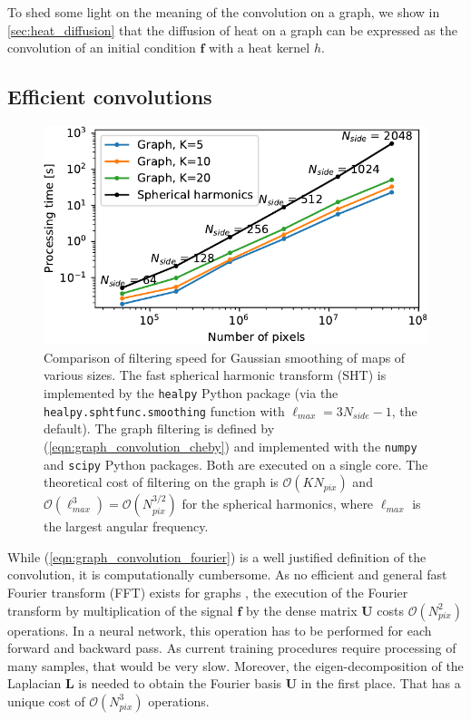 \documentclass[final,twocolumn,3p,times,sort&compress]{elsarticle}
\newcommand{\eqnref}[1]{(\ref{eqn:#1})}
\renewcommand{\b}[1]{{\bm{#1}}}   %
\newcommand{\1}{\b{1}}              %
\newcommand{\0}{\b{0}}              %
\renewcommand{\L}{\b{L}}
\newcommand{\U}{\b{U}}
\newcommand{\f}{\b{f}}
\newcommand{\bO}{\mathcal{O}}
\begin{document}
To shed some light on the meaning of the convolution on a graph, we show in \ref{sec:heat_diffusion} that the diffusion of heat on a graph can be expressed as the convolution of an initial condition $\f$ with a heat kernel $h$.

\subsection{Efficient convolutions}
\label{sec:efficient_convolution}

\begin{figure}
    \centering
    \includegraphics[width=\linewidth]{filtering_speed}
    \caption{Comparison of filtering speed for Gaussian smoothing of maps of various sizes.
    The fast spherical harmonic transform (SHT) is implemented by the \texttt{healpy} Python package (via the \texttt{healpy.sphtfunc.smoothing} function with $\ell_{max} = 3 N_{side} - 1$, the default).
    The graph filtering is defined by \eqnref{graph_convolution_cheby} and implemented with the \texttt{numpy} and \texttt{scipy} Python packages.
    Both are executed on a single core.
	The theoretical cost of filtering on the graph is $\bO(K N_{pix})$ and $\bO(\ell_{max}^3) = \bO(N_{pix}^{3/2})$ for the spherical harmonics, where $\ell_{max}$ is the largest angular frequency.}
    \label{fig:filtering_speed}
\end{figure}

While \eqnref{graph_convolution_fourier} is a well justified definition of the convolution, it is computationally cumbersome.
As no efficient and general fast Fourier transform (FFT) exists for graphs \citep{le2018fgft}, the execution of the Fourier transform by multiplication of the signal $\f$ by the dense matrix $\U$ costs $\bO(N_{pix}^2)$ operations.
In a neural network, this operation has to be performed for each forward and backward pass.
As current training procedures require processing of many samples, that would be very slow.
Moreover, the eigen-decomposition of the Laplacian $\L$ is needed to obtain the Fourier basis $\U$ in the first place.
That has a unique cost of $\bO(N_{pix}^3)$ operations.
\end{document}
